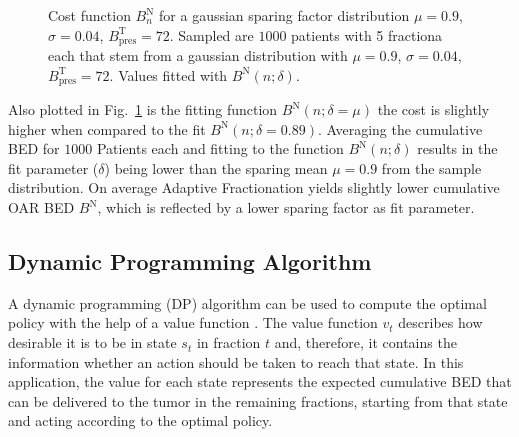\documentclass[\relativeRoot/ada.tex]{subfiles}
\begin{document}
\begin{figure}[!htb]
    
\caption{Cost function $B^{\text{N}}_n$ for a gaussian sparing factor distribution $\mu=0.9$, $\sigma=0.04$, $B_{\text{pres}}^{\text{T}}=72$. Sampled are $1000$ patients with 5 fractiona each that stem from a gaussian distribution with $\mu=0.9$, $\sigma=0.04$, $B_{\text{pres}}^{\text{T}}=72$. Values fitted with $B^{\text{N}}(n; \delta)$.}
\label{fig:cost_function}
\end{figure}
Also plotted in Fig.~\ref{fig:cost_function} is the fitting function $B^{\text{N}}(n; \delta=\mu)$ the cost is slightly higher when compared to the fit $B^{\text{N}}(n; \delta=0.89)$. Averaging the cumulative BED for $1000$ Patients each and fitting to the function $B^{\text{N}}(n;\delta)$ results in the fit parameter ($\delta$) being lower than the sparing mean $\mu=0.9$ from the sample distribution. On average Adaptive Fractionation yields slightly lower cumulative OAR BED $B^{\text{N}}$, which is reflected by a lower sparing factor as fit parameter.


\subsection{Dynamic Programming Algorithm}
\label{sec:DP}
A dynamic programming (DP) algorithm can be used to compute the optimal policy with the help of a value function \cite{sutton_reinforcement}. The value function $v_t$ describes how desirable it is to be in state $s_t$ in fraction $t$ and, therefore, it contains the information whether an action should be taken to reach that state. In this application, the value for each state represents the expected cumulative BED that can be delivered to the tumor in the remaining fractions, starting from that state and acting according to the optimal policy.
\end{document}
